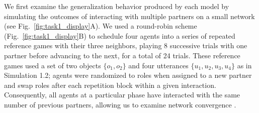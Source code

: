 We first examine the generalization behavior produced by each model by simulating the outcomes of interacting with multiple partners on a small network (see Fig.~\ref{fig:task1_display}A). 
We used a round-robin scheme (Fig.~\ref{fig:task1_display}B) to schedule four agents into a series of repeated reference games with their three neighbors, playing 8 successive trials with one partner before advancing to the next, for a total of 24 trials.
These reference games used a set of two objects $\{o_1, o_2\}$ and four utterances $\{u_1, u_2, u_3, u_4\}$ as in Simulation 1.2; agents were randomized to roles when assigned to a new partner and swap roles after each repetition block within a given interaction.
Consequently, all agents at a particular phase have interacted with the same number of previous partners, allowing us to examine network convergence \cite<but see>[for a ``first-person'' version of the analysis where each partner is entirely fresh to the task, finding similar generalization dynamics]{hawkins2020generalizing}.

